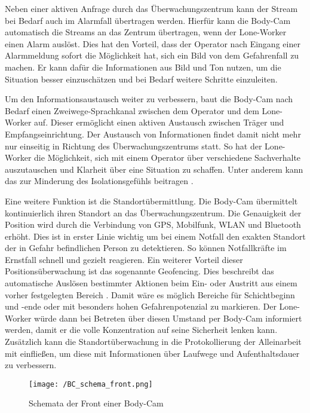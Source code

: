 \documentclass[thesis.tex]{subfiles}
\begin{document}
Neben einer aktiven Anfrage durch das Überwachungszentrum kann der Stream bei Bedarf auch im Alarmfall übertragen werden.
Hierfür kann die Body-Cam automatisch die Streams an das Zentrum übertragen, wenn der Lone-Worker einen Alarm auslöst.
Dies hat den Vorteil, dass der Operator nach Eingang einer Alarmmeldung sofort die Möglichkeit hat, sich ein Bild von dem Gefahrenfall zu machen.
Er kann dafür die Informationen aus Bild und Ton nutzen, um die Situation besser einzuschätzen und bei Bedarf weitere Schritte einzuleiten.

Um den Informationsaustausch weiter zu verbessern, baut die Body-Cam nach Bedarf einen Zweiwege-Sprachkanal zwischen dem Operator und dem Lone-Worker auf.
Dieser ermöglicht einen aktiven Austausch zwischen Träger und Empfangseinrichtung.
Der Austausch von Informationen findet damit nicht mehr nur einseitig in Richtung des Überwachungszentrums statt.
So hat der Lone-Worker die Möglichkeit, sich mit einem Operator über verschiedene Sachverhalte auszutauschen und Klarheit über eine Situation zu schaffen.
Unter anderem kann das zur Minderung des Isolationsgefühls beitragen \cite[vgl. S.~45][]{GeyerMagiera2022}.

Eine weitere Funktion ist die Standortübermittlung.
Die Body-Cam übermittelt kontinuierlich ihren Standort an das Überwachungszentrum.
Die Genauigkeit der Position wird durch die Verbindung von GPS, Mobilfunk, WLAN und Bluetooth erhöht.
Dies ist in erster Linie wichtig um bei einem Notfall den exakten Standort der in Gefahr befindlichen Person zu detektieren.
So können Notfallkräfte im Ernstfall schnell und gezielt reagieren.
Ein weiterer Vorteil dieser Positionsüberwachung ist das sogenannte Geofencing.
Dies beschreibt das automatische Auslösen bestimmter Aktionen beim Ein- oder Austritt aus einem vorher festgelegten Bereich \cite[]{geofencing}.
Damit wäre es möglich Bereiche für Schichtbeginn und -ende oder mit besonders hohen Gefahrenpotenzial zu markieren.
Der Lone-Worker würde dann bei Betreten über diesen Umstand per Body-Cam informiert werden, damit er die volle Konzentration auf seine Sicherheit lenken kann.
Zusätzlich kann die Standortüberwachung in die Protokollierung der Alleinarbeit mit einfließen, um diese mit Informationen über Laufwege und Aufenthaltsdauer zu verbessern.

\begin{figure}[h]
    \centering
    \texttt{[image: /BC\_schema\_front.png]}
    \caption[Schemata der Front einer Body-Cam]{Schemata der Front einer Body-Cam \cite{netco}}
    \label{fig:BC_schema}
\end{figure}
\end{document}
